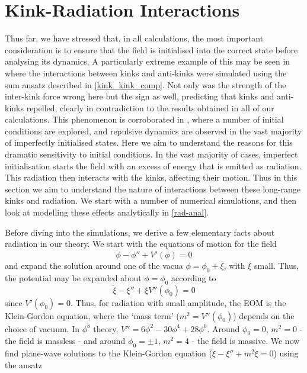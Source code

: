 \documentclass[11pt, oneside]{article}  	%
\numberwithin{equation}{section}
\begin{document}
 \section{Kink-Radiation Interactions}\label{kink_radiation}
 Thus far, we have stressed that, in all calculations, the most important consideration is to ensure that the field is initialised into the correct state before analysing its dynamics. A particularly extreme example of this may be seen in \cite{belendryasova} where the interactions between kinks and anti-kinks were simulated using the sum ansatz described in \textsection \ref{kink_kink_comp}. Not only was the strength of the inter-kink force wrong here but the sign as well, predicting that kinks and anti-kinks repelled, clearly in contradiction to the results obtained in all of our calculations. This phenomenon is corroborated in \cite{christov-num}, where a number of initial conditions are explored, and repulsive dynamics are observed in the vast majority of imperfectly initialised states. Here we aim to understand the reasons for this dramatic sensitivity to initial conditions. In the vast majority of cases, imperfect initialisation starts the field with an excess of energy that is emitted as radiation. This radiation then interacts with the kinks, affecting their motion. Thus in this section we aim to understand the nature of interactions between these long-range kinks and radiation. We start with a number of numerical simulations, and then look at modelling these effects analytically in \textsection \ref{rad-anal}. \par
 Before diving into the simulations, we derive a few elementary facts about radiation in our theory. We start with the equations of motion for the field
 \begin{equation}
 \ddot{\phi} - \phi'' + V'(\phi) = 0
 \end{equation}
and expand the solution around one of the vacua $\phi = \phi_0 + \xi$, with $\xi$ small. Thus, the potential may be expanded about $\phi = \phi_0$ according to
\begin{equation}
\ddot{\xi} -\xi'' + \xi V''(\phi_0) = 0
\end{equation}
since $V'(\phi_0) = 0$. Thus, for radiation with small amplitude, the EOM is the Klein-Gordon equation, where the `mass term' ($m^2 = V''(\phi_0)$) depends on the choice of vacuum. In $\phi^8$ theory, $V'' = 6\phi^2 -30\phi^4 + 28\phi^6$. Around $\phi_0 = 0$, $m^2 = 0$ - the field is massless - and around $\phi_0 = \pm1$, $m^2 = 4$ - the field is massive.
We now find plane-wave solutions to the Klein-Gordon equation ($\ddot{\xi} - \xi'' + m^2\xi = 0$) using the ansatz
\end{document}
